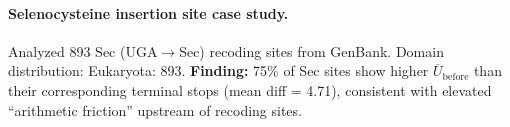 \paragraph{Selenocysteine insertion site case study.}
Analyzed 893 Sec (UGA$\to$Sec) recoding sites from GenBank.
Domain distribution: Eukaryota: 893.
\textbf{Finding:} 75\% of Sec sites show higher $\overline{U}_{\mathrm{before}}$ than their corresponding terminal stops (mean diff = 4.71), consistent with elevated ``arithmetic friction'' upstream of recoding sites.
